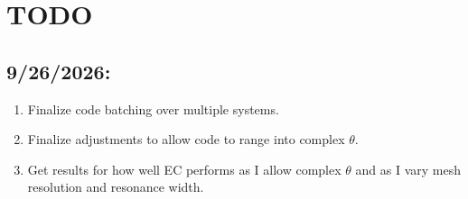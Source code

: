 \documentclass[12pt]{article}
\begin{document}
    \section*{TODO}
    
    \subsection*{9/26/2026:}
    \begin{enumerate}
        \item Finalize code batching over multiple systems.
        \item Finalize adjustments to allow code to range into complex $\theta$.
        \item Get results for how well EC performs as I allow complex $\theta$ and as I vary mesh resolution and resonance width.
    \end{enumerate}
\end{document}
